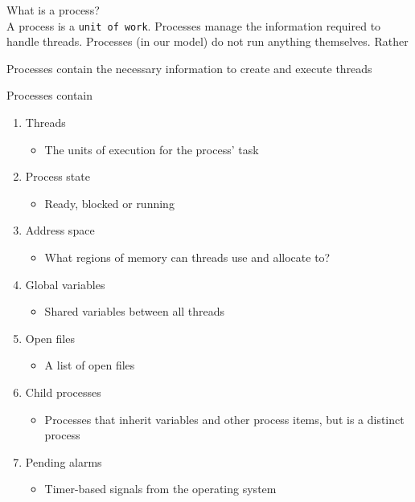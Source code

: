 \documentclass[journal, letterpaper]{IEEEtran}
\begin{document}
\begin{theory}{What is a process?} \\
    A process is a \verb|unit of work|. Processes manage the information required to handle threads. Processes (in our model) do not run anything themselves. Rather
    \begin{center}
        Processes contain the necessary information to create and execute threads
    \end{center}
    Processes contain
    \begin{enumerate}
        \item Threads
        \begin{itemize}
            \item The units of execution for the process' task
        \end{itemize}
        \item Process state
        \begin{itemize}
            \item Ready, blocked or running
        \end{itemize}
        \item Address space
        \begin{itemize}
            \item What regions of memory can threads use and allocate to?
        \end{itemize}
        \item Global variables
        \begin{itemize}
            \item Shared variables between all threads
        \end{itemize}
        \item Open files
        \begin{itemize}
            \item A list of open files 
        \end{itemize}
        \item Child processes
        \begin{itemize}
            \item Processes that inherit variables and other process items, but is a distinct process
        \end{itemize}
        \item Pending alarms
        \begin{itemize}
            \item Timer-based signals from the operating system
        \end{itemize}
    \end{enumerate}
\end{theory}
\end{document}
